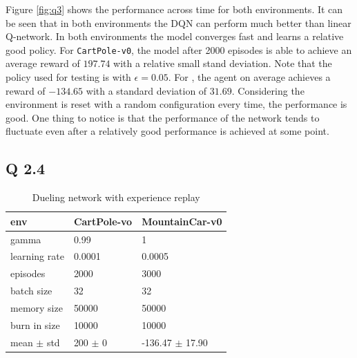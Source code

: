 \documentclass[12pt]{article}
\begin{document}
Figure \ref{fig:q3} shows the performance across time for both environments. It can be seen that in both environments the DQN can perform much better than linear Q-network. In both environments the model converges fast and learns a relative good policy. For \texttt{CartPole-v0}, the model after 2000 episodes is able to achieve an average reward of $197.74$ with a relative small stand deviation. Note that the policy used for testing is with $\epsilon=0.05$. For , the agent on average achieves a reward of $-134.65$ with a standard deviation of $31.69$. Considering the environment is reset with a random configuration every time, the performance is good. One thing to notice is that the performance of the network tends to fluctuate even after a relatively good performance is achieved at some point.


\subsection*{Q 2.4}
\begin{table}[h!]
\centering
\caption{Dueling network with experience replay}
\label{tab:dueling}
\begin{tabular}{|l|l|l|}
\hline
env           & CartPole-vo & MountainCar-v0 \\ \hline
gamma         & 0.99        &    1            \\ \hline
learning rate & 0.0001      &           0.0005     \\ \hline
episodes      & 2000        &       3000         \\ \hline
batch size      & 32        &       32         \\ \hline
memory size      & 50000        &       50000         \\ \hline
burn in size      & 10000        &       10000         \\ \hline
mean $\pm$ std  & 200 $\pm$ 0 &    -136.47 $\pm$ 17.90\\ \hline
\end{tabular}
\end{table}
\end{document}
